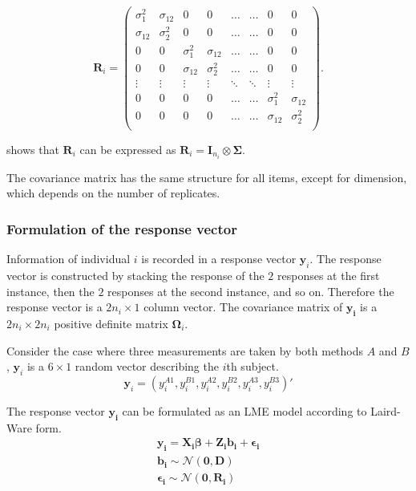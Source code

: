 \documentclass[12pt, a4paper]{report}
\theoremstyle{plain}
\theoremstyle{definition}
\theoremstyle{remark}
\begin{document}
	\[ \boldsymbol{R}_i =\left(
	\begin{array}{cccccccc}
	\sigma^2_1  & \sigma_{12} & 0 & 0 & \ldots & \ldots & 0 & 0 \\
	\sigma_{12} & \sigma^2_2  & 0 & 0  & \ldots & \ldots & 0 & 0\\
	
	0 & 0 &\sigma^2_1  & \sigma_{12} & \ldots & \ldots& 0 &  0 \\
	0 & 0 &\sigma_{12} & \sigma^2_2  & \ldots & \ldots & 0 & 0 \\
	\vdots & \vdots &\vdots & \vdots & \ddots & \ddots& \vdots & \vdots \\
	
	0 & 0 &0 & 0 & \ldots & \ldots&\sigma^2_1  & \sigma_{12} \\
	0 & 0 &0 & 0 & \ldots & \ldots &\sigma_{12} & \sigma^2_2 \\
	\end{array}
	\right). \]
	
	
	\citet{hamlett} shows that $\boldsymbol{R}_{i}$  can be expressed as $\boldsymbol{R}_{i} = \boldsymbol{I}_{n_{i}} \otimes \boldsymbol{\Sigma}$. 
	
	
	
	
	The covariance matrix has the same structure for all items, except for dimension, which depends on the number of replicates. 
	
	\subsubsection{Formulation of the response vector}
	Information of individual $i$ is recorded in a response vector $\boldsymbol{y}_{i}$. The response vector is constructed by stacking the response of the $2$ responses at the first instance, then the $2$ responses at the second instance, and so on. Therefore the response vector is a $2n_{i} \times 1$ column vector.
	The covariance matrix of $\boldsymbol{y_{i}}$ is a $2n_{i} \times 2n_{i}$ positive definite matrix $\boldsymbol{\Omega}_{i}$.
	
	Consider the case where three measurements are taken by both methods $A$ and $B$, $\boldsymbol{y}_{i}$ is a $6 \times 1$ random vector describing the $i$th subject.
	\[
	\boldsymbol{y}_{i} = (y_{i}^{A1},y_{i}^{B1},y_{i}^{A2},y_{i}^{B2},y_{i}^{A3},y_{i}^{B3}) \prime
	\]
	
	The response vector $\boldsymbol{y_{i}}$ can be formulated as an LME model according to Laird-Ware form.
	\begin{eqnarray*}
		\boldsymbol{y_{i}} = \boldsymbol{X_{i}\beta}  + \boldsymbol{Z_{i}b_{i}} + \boldsymbol{\epsilon_{i}}\\
		\boldsymbol{b_{i}} \sim \mathcal{N}(\boldsymbol{0,D})\\
		\boldsymbol{\epsilon_{i}} \sim \mathcal{N}(\boldsymbol{0,R_{i}})
	\end{eqnarray*}
	
\end{document}
